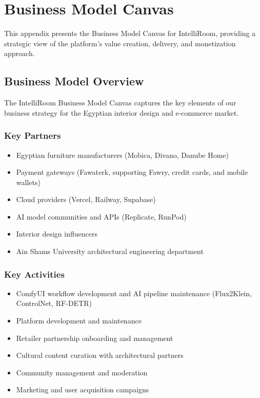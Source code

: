 
\chapter{Business Model Canvas}
\label{app:business_model}

This appendix presents the Business Model Canvas for IntelliRoom, providing a strategic view of the platform's value creation, delivery, and monetization approach.

\section{Business Model Overview}
\label{sec:app_bmc_visual}

The IntelliRoom Business Model Canvas captures the key elements of our business strategy for the Egyptian interior design and e-commerce market.

\subsection{Key Partners}

\begin{itemize}
    \item Egyptian furniture manufacturers (Mobica, Divano, Danube Home)
    \item Payment gateways (Fawaterk, supporting Fawry, credit cards, and mobile wallets)
    \item Cloud providers (Vercel, Railway, Supabase)
    \item AI model communities and APIs (Replicate, RunPod)
    \item Interior design influencers
    \item Ain Shams University architectural engineering department
\end{itemize}

\subsection{Key Activities}

\begin{itemize}
    \item ComfyUI workflow development and AI pipeline maintenance (Flux2Klein, ControlNet, RF-DETR)
    \item Platform development and maintenance
    \item Retailer partnership onboarding and management
    \item Cultural content curation with architectural partners
    \item Community management and moderation
    \item Marketing and user acquisition campaigns
\end{itemize}

